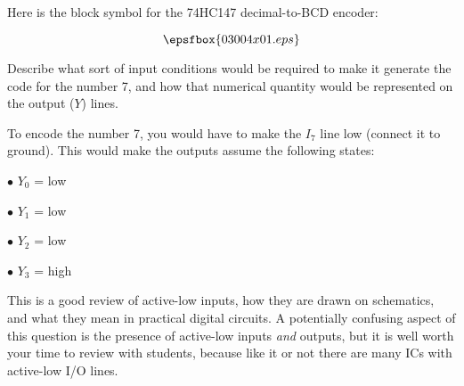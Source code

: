 

Here is the block symbol for the 74HC147 decimal-to-BCD encoder:

$$\epsfbox{03004x01.eps}$$

Describe what sort of input conditions would be required to make it generate the code for the number 7, and how that numerical quantity would be represented on the output ($Y$) lines.







To encode the number 7, you would have to make the $I_7$ line low (connect it to ground).  This would make the outputs assume the following states:

\medskip
\item{$\bullet$} $Y_0$ = low
\item{$\bullet$} $Y_1$ = low
\item{$\bullet$} $Y_2$ = low
\item{$\bullet$} $Y_3$ = high
\medskip







This is a good review of active-low inputs, how they are drawn on schematics, and what they mean in practical digital circuits.  A potentially confusing aspect of this question is the presence of active-low inputs {\it and} outputs, but it is well worth your time to review with students, because like it or not there are many ICs with active-low I/O lines.





